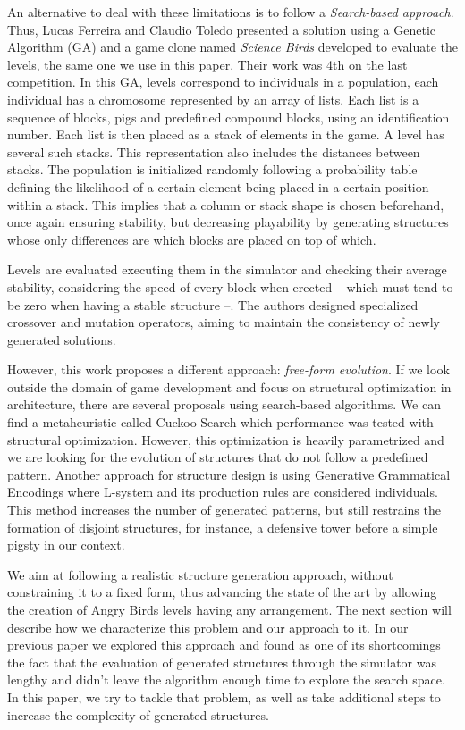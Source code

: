 \documentclass[a4paper,twoside]{article}
\begin{document}
An alternative to deal with these limitations is to follow a \textit{Search-based approach}. Thus, Lucas Ferreira and Claudio Toledo \cite{ferreira2014search} presented a solution using a Genetic Algorithm (GA) and a game clone named \textit{Science Birds} developed to evaluate the levels, the same one we use in this paper. Their work was 4th on the last competition. In this GA, levels correspond to individuals in a population, each individual has a chromosome represented by an array of lists. Each list is a sequence of blocks, pigs and predefined compound blocks, using an identification number. Each list is then placed as a stack of elements in the game. A level has several such stacks. This representation also includes the distances between stacks. The population is initialized randomly following a probability table defining the likelihood of a certain element being placed in a certain position within a stack. This implies that a column or stack shape is chosen beforehand, once again ensuring stability, but decreasing playability by generating structures whose only differences are which blocks are placed on top of which.   

Levels are evaluated executing them in the simulator and checking their average stability, considering the speed of every block when erected -- which must tend to be zero when having a stable structure --. The authors designed specialized crossover and mutation operators, aiming to maintain the consistency of newly generated solutions.

However, this work proposes a different approach: \textit{free-form evolution}.  If we look outside the domain of game development and focus on structural optimization in architecture, there are several proposals using search-based algorithms. We can find a metaheuristic called Cuckoo Search \cite{gandomi2013cuckoo} which performance was tested with structural optimization. However, this optimization is heavily parametrized and we are looking for the evolution of structures that do not follow a predefined pattern.  Another approach for structure design is using Generative Grammatical Encodings \cite{hornby2001advantages} where L-system and its production rules are considered individuals. This method increases the number of generated patterns,  but still restrains the formation of disjoint structures, for instance, a defensive tower before a simple pigsty in our context.

We aim at following a realistic structure generation approach, without constraining it to a fixed form, thus advancing the state of the art by allowing the creation of Angry Birds levels having any arrangement. The next section will describe how we characterize this problem and our approach to it. In our previous paper \cite{DBLP:conf/evoW/CalleGGV19} we explored this approach and found as one of its shortcomings the fact that the evaluation of generated structures through the simulator was lengthy and didn't leave the algorithm enough time to explore the search space. In this paper, we try to tackle that problem, as well as take additional steps to increase the complexity of generated structures.
\end{document}
